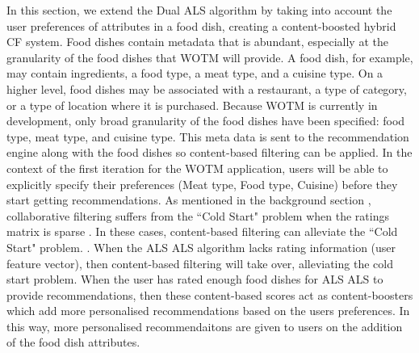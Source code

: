 In this section, we extend the Dual ALS algorithm by taking into account the user preferences of attributes in a food dish, creating a content-boosted hybrid CF system. Food dishes contain metadata that is abundant, especially at the granularity of the food dishes that WOTM will provide. A food dish, for example, may contain ingredients, a food type, a meat type, and a cuisine type. On a higher level, food dishes may be associated with a restaurant, a type of category, or a type of location where it is purchased. Because WOTM is currently in development, only broad granularity of the food dishes have been specified: food type, meat type, and cuisine type. This meta data is sent to the recommendation engine along with the food dishes so content-based filtering can be applied. In the context of the first iteration for the WOTM application, users will be able to explicitly specify their preferences (Meat type, Food type, Cuisine) before they start getting recommendations. As mentioned in the background section , collaborative filtering suffers from the ``Cold Start" problem when the ratings matrix is sparse . In these cases, content-based filtering can alleviate the ``Cold Start" problem. . When the ALS ALS algorithm lacks rating information (user feature vector), then content-based filtering will take over, alleviating the cold start problem. When the user has rated enough food dishes for ALS ALS to provide recommendations, then these content-based scores act as content-boosters which add more personalised recommendations based on the users preferences. In this way, more personalised recommendaitons are given to users on the addition of the food dish attributes.


